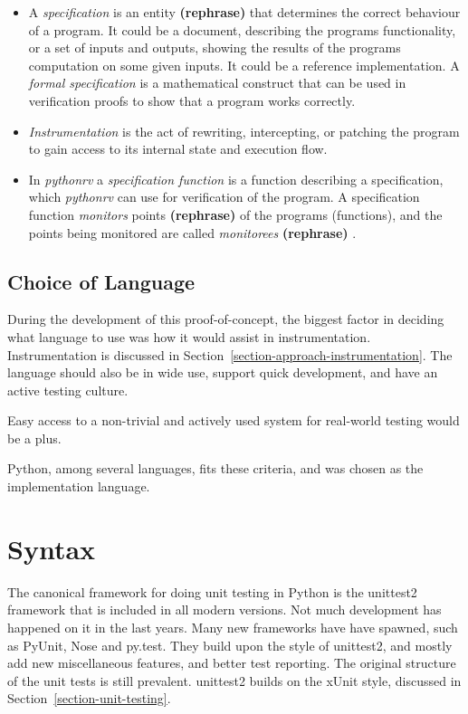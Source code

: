 \documentclass[a4paper,11pt]{kth-mag}
\newcommand{\rephrase}{\textbf{(rephrase)} }
\begin{document}
\begin{itemize}
	\item A \textit{specification} is an entity \rephrase that determines the
		correct behaviour of a program. It could be a document, describing the
		programs functionality, or a set of inputs and outputs, showing the results
		of the programs computation on some given inputs. It could be a reference
		implementation. A \textit{formal specification} is a mathematical construct
		that can be used in verification proofs to show that a program works
		correctly.

	\item \textit{Instrumentation} is the act of rewriting, intercepting, or
		patching the program to gain access to its internal state and execution
		flow.

	\item In \textit{pythonrv} a \textit{specification function} is a function
		describing a specification, which \textit{pythonrv} can use for
		verification of the program. A specification function \textit{monitors}
		points \rephrase of the programs (functions), and the points being
		monitored are called \textit{monitorees} \rephrase.
\end{itemize}

\subsection{Choice of Language}

During the development of this proof-of-concept, the biggest factor in deciding
what language to use was how it would assist in instrumentation.
Instrumentation is discussed in Section~\ref{section-approach-instrumentation}.
The language should also be in wide use, support quick development, and have an
active testing culture.

Easy access to a non-trivial and actively used system for real-world testing
would be a plus.

Python, among several languages, fits these criteria, and was chosen as the
implementation language.

\section{Syntax}

The canonical framework for doing unit testing in Python is the unittest2
framework that is included in all modern versions. Not much development has
happened on it in the last years. Many new frameworks have have spawned, such
as PyUnit, Nose and py.test. They build upon the style of unittest2, and mostly
add new miscellaneous features, and better test reporting. The original
structure of the unit tests is still prevalent. unittest2 builds on the xUnit
style, discussed in Section~\ref{section-unit-testing}.
\end{document}
